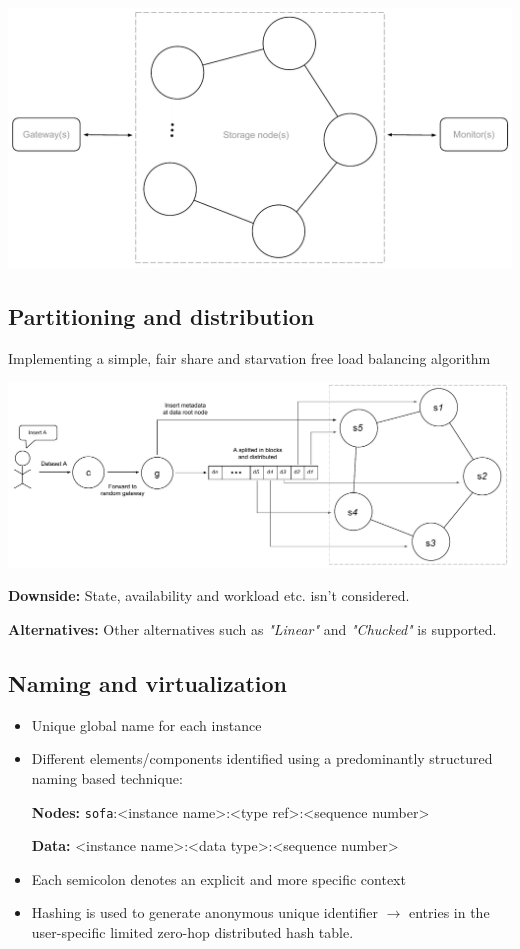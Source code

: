 \documentclass[paper=128mm:96mm, fontsize=11pt, pagesize, parskip=half-,]{scrartcl}
\theoremstyle{definition}
\newenvironment{Figure}
  {\par\medskip\noindent\minipage{\linewidth}}
  {\endminipage\par\medskip}
\newcommand*{\centerinpage}[1]{
	\null \vfill
	\begin{Figure}
		\centering	
		#1	
	\end{Figure}
	\vfill \null}
\newcommand*{\newslide}{\clearpage}
\begin{document}
\centerinpage{
	\begin{Figure}
		\centering\includegraphics[scale=0.5]{../Report/pdf/architecture-overview.pdf}
	\end{Figure}
}

\newslide

\subsection{Partitioning and distribution}
Implementing a simple, fair share and starvation free load balancing algorithm
\begin{Figure}
	\centering\includegraphics[scale=0.32]{../Report/pdf/rr-partitioning.pdf}
\end{Figure}	
\textbf{Downside:} State, availability and workload etc. isn't considered.

\textbf{Alternatives:} Other alternatives such as \textit{"Linear"} and \textit{"Chucked"} is supported.
\newslide

\subsection{Naming and virtualization}
\begin{itemize}
	\item Unique global name for each instance
	\item Different elements/components identified using a predominantly structured naming based technique:
		
	\quad \textbf{Nodes:} \texttt{sofa}:<instance name>:<type ref>:<sequence number>

	\quad \textbf{Data:} <instance name>:<data type>:<sequence number>
	
	\item Each semicolon denotes an explicit and more specific context
	\item Hashing is used to generate anonymous unique identifier $\rightarrow$ entries in the user-specific limited zero-hop distributed hash table.
\end{itemize}
\newslide
\end{document}
